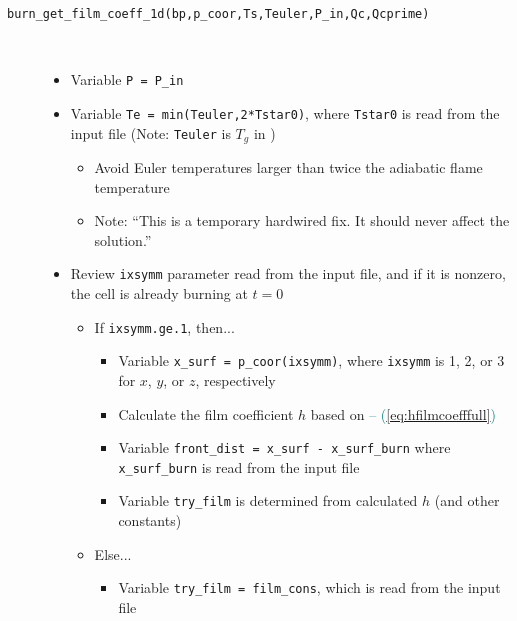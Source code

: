 \begin{description}

\item[\texttt{burn\_get\_film\_coeff\_1d(bp,p\_coor,Ts,Teuler,P\_in,Qc,Qcprime)}]{\hfill \\ \vspace{-15pt}
\begin{itemize}
\item{Variable \texttt{P = P\_in}}
\item{Variable \texttt{Te = min(Teuler,2*Tstar0)}, where  \texttt{Tstar0} is read from the input file (Note: \texttt{Teuler} is $T_g$ in )}
	\begin{itemize}
		\item{Avoid Euler temperatures larger than twice the adiabatic flame temperature}
		\item{Note: ``This is a temporary hardwired fix. It should never affect the solution.''}
	\end{itemize}

\item{Review \texttt{ixsymm} parameter read from the input file, and if it is nonzero, the cell is already burning at $t=0$}

	\begin{itemize}

	\item{If \texttt{ixsymm.ge.1}, then...}
		\begin{itemize}
			\item{Variable \texttt{x\_surf = p\_coor(ixsymm)}, where \texttt{ixsymm} is 1, 2, or 3 for $x$, $y$, or $z$, respectively}
			\item{Calculate the film coefficient $h$ based on  \textcolor{teal}{-- (\ref{eq:hfilmcoefffull})}}
			\item{Variable \texttt{front\_dist = x\_surf - x\_surf\_burn} where \texttt{x\_surf\_burn} is read from the input file}
			\item{Variable \texttt{try\_film} is determined from calculated $h$ (and other constants)}
		\end{itemize}

	\item{Else...}
		\begin{itemize}
			\item{Variable \texttt{try\_film = film\_cons}, which is read from the input file}
		\end{itemize}

	\end{itemize}


\end{itemize}}
\end{description}
